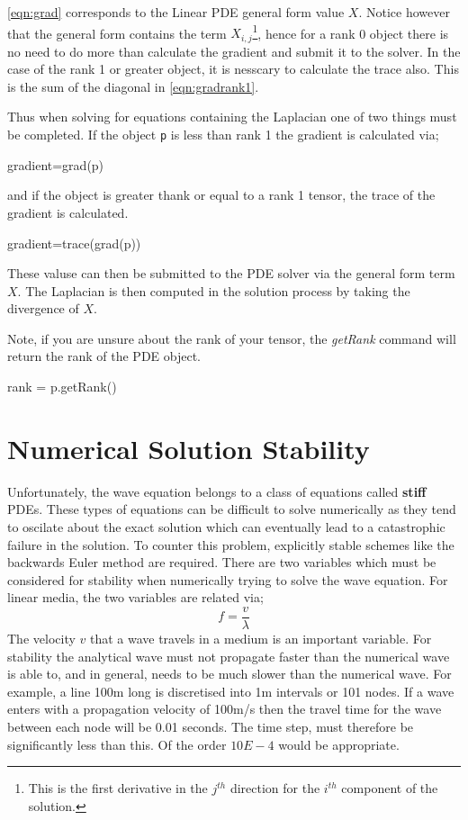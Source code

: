 \autoref{eqn:grad} corresponds to the Linear PDE general form value
$X$. Notice however that the general form contains the term $X
_{i,j}$\footnote{This is the first derivative in the $j^{th}$
direction for the $i^{th}$ component of the solution.},
hence for a rank 0 object there is no need to do more than calculate the
gradient and submit it to the solver. In the case of the rank 1 or greater
object, it is nesscary to calculate the trace also. This is the sum of the
diagonal in \autoref{eqn:gradrank1}. 

Thus when solving for equations containing the Laplacian one of two things must
be completed. If the object \verb!p! is less than rank 1 the gradient is
calculated via;
\begin{python}
gradient=grad(p)
\end{python}
and if the object is greater thank or equal to a rank 1 tensor, the trace of
the gradient is calculated.
\begin{python}
 gradient=trace(grad(p))
\end{python}
These valuse can then be submitted to the PDE solver via the general form term
$X$. The Laplacian is then computed in the solution process by taking the
divergence of $X$.

Note, if you are unsure about the rank of your tensor, the \textit{getRank}
command will return the rank of the PDE object.
\begin{python}
 rank = p.getRank()
\end{python}


\section{Numerical Solution Stability} \label{sec:nsstab}
Unfortunately, the wave equation belongs to a class of equations called
\textbf{stiff} PDEs. These types of equations can be difficult to solve
numerically as they tend to oscilate about the exact solution which can
eventually lead to a catastrophic failure in the solution. To counter this
problem, explicitly stable schemes like
the backwards Euler method are required. There are two variables which must be
considered for stability when numerically trying to solve the wave equation.
For linear media, the two variables are related via;
\begin{equation} \label{eqn:freqvel}
f=\frac{v}{\lambda}
\end{equation}
The velocity $v$ that a wave travels in a medium is an important variable. For
stability the analytical wave must not propagate faster than the numerical wave
is able to, and in general, needs to be much slower than the numerical wave.
For example, a line 100m long is discretised into 1m intervals or 101 nodes. If
a wave enters with a propagation velocity of 100m/s then the travel time for
the wave between each node will be 0.01 seconds. The time step, must therefore
be significantly less than this. Of the order $10E-4$ would be appropriate. 

